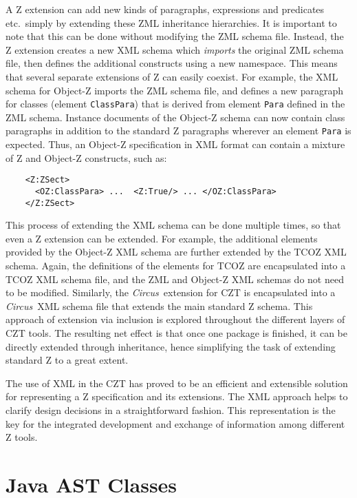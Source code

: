 \documentclass{llncs}
\newcommand{\Circus}{{\sf\slshape Circus}}
\newcommand{\Element}[1]{\texttt{#1}}
\begin{document}
  A Z extension can add new kinds of paragraphs, expressions and predicates
  etc.~simply by extending these ZML inheritance hierarchies.  It is
  important to note that this can be done without modifying the
  ZML schema file.  Instead, the Z extension creates a new XML schema
  which \emph{imports} the original ZML schema file, then defines the
  additional constructs using a new namespace.
  This means that several separate extensions of Z can easily coexist.
  For example, the XML schema for Object-Z imports
  the ZML schema file, and defines a new paragraph for classes (element
  \Element{ClassPara}) that is derived from element \Element{Para}
  defined in the ZML schema.  Instance documents of the Object-Z
  schema can now contain class paragraphs in addition to the standard Z
  paragraphs wherever an element \Element{Para} is expected.  Thus,
  an Object-Z specification in XML format can contain a mixture of
  Z and Object-Z constructs, such as:
\begin{small}
\begin{verbatim}
    <Z:ZSect>
      <OZ:ClassPara> ...  <Z:True/> ... </OZ:ClassPara>
    </Z:ZSect>
\end{verbatim}
\end{small}

  This process of extending the XML schema can be done multiple times, so
  that even a Z extension can be extended.  For example, the
  additional elements provided by the Object-Z XML schema are further
  extended by the TCOZ XML schema.  Again, the definitions of the elements
  for TCOZ are encapsulated into a TCOZ XML schema file, and the ZML and
  Object-Z XML schemas do not need to be modified.
  Similarly, the \Circus\ extension for CZT is encapsulated into a
  \Circus\ XML schema file that extends the main standard Z schema.
  This approach of extension via inclusion is explored throughout the
  different layers of CZT tools.
  The resulting net effect is that once one package is finished, it
  can be directly extended through inheritance, hence simplifying the
  task of extending standard Z to a great extent.

  The use of XML in the CZT has proved to be an efficient and extensible
  solution for representing a Z specification and its extensions.  The
  XML approach helps to clarify design decisions in a straightforward
  fashion.  This representation is the key for the integrated
  development and exchange of information among different Z tools.

\section{Java AST Classes}\label{java-ast-classes}
\end{document}
